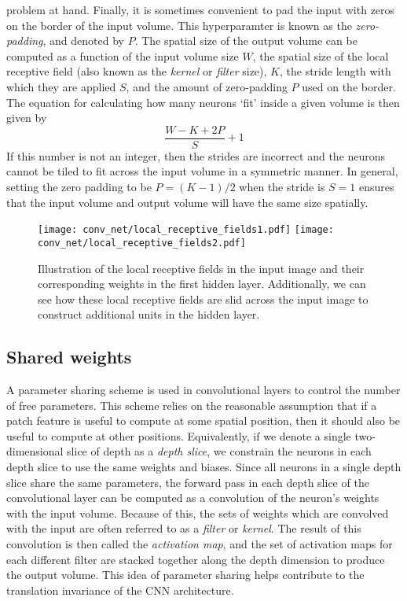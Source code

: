 \documentclass[../main.tex]{subfiles}
\begin{document}
problem at hand.
%
Finally, it is sometimes convenient to pad the input with zeros on the border
of the input volume.
%
This hyperparamter is known as the \emph{zero-padding}, and denoted by $P$.
%
The spatial size of the output volume can be computed as a function of the
input volume size $W$, the spatial size of the local receptive field (also
known as the \emph{kernel} or \emph{filter} size), $K$, the stride length with
which they are applied $S$, and the amount of zero-padding $P$ used on the
border.
%
The equation for calculating how many neurons `fit' inside a given volume is
then given by
%
\begin{equation}
  \frac{W - K + 2P}{S} + 1
\end{equation}
%
If this number is not an integer, then the strides are incorrect and the
neurons cannot be tiled to fit across the input volume in a symmetric manner.
%
In general, setting the zero padding to be $P = (K - 1) / 2$ when the stride is
$S=1$ ensures that the input volume and output volume will have the same size
spatially.
%
\begin{figure}[htpb]
  \centering
  \texttt{[image: conv\_net/local\_receptive\_fields1.pdf]}
  \hfill
  \texttt{[image: conv\_net/local\_receptive\_fields2.pdf]}
  \caption{Illustration of the local receptive fields in the input image and
    their corresponding weights in the first hidden layer. Additionally, we can
    see how these local receptive fields are slid across the input image to
    construct additional units in the hidden layer.}%
\label{fig:local_receptive_field}
\end{figure}
%
\subsection{Shared weights}
A parameter sharing scheme is used in convolutional layers to control the
number of free parameters.
%
This scheme relies on the reasonable assumption that if a patch feature is
useful to compute at some spatial position, then it should also be useful to
compute at other positions.
%
Equivalently, if we denote a single two-dimensional slice of depth as a
\emph{depth slice}, we constrain the neurons in each depth slice to use the
same weights and biases.
%
Since all neurons in a single depth slice share the same parameters, the
forward pass in each depth slice of the convolutional layer can be computed as
a convolution of the neuron's weights with the input volume.
%
Because of this, the sets of weights which are convolved with the input are
often referred to as a \emph{filter} or \emph{kernel}.
%
The result of this convolution is then called the \emph{activation map}, and
the set of activation maps for each different filter are stacked together along
the depth dimension to produce the output volume.
%
This idea of parameter sharing helps contribute to the translation invariance
of the CNN architecture.
%
\end{document}
